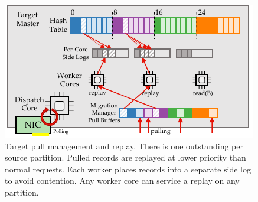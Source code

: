 \begin{figure}[t]
\centering
\includegraphics[width=0.9\columnwidth]{figures/rocksteady-target.pdf}
\caption{Target pull management and replay. There is one \pull
  outstanding per source partition. Pulled records are replayed
  at lower priority than normal requests.
  Each worker places records into
  a separate side log to avoid contention. Any worker core can service a
  replay on any partition.}%
\label{fig:target}%
\end{figure}
